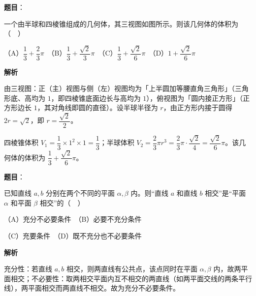 \begin{answer}

\textbf{题目}：

一个由半球和四棱锥组成的几何体，其三视图如图所示。则该几何体的体积为（　）
\nopagebreak[4]
\begin{center}\end{center}
\nopagebreak[4]
（A）\(\dfrac{1}{3}+\dfrac{2}{3}\pi\)　（B）\(\dfrac{1}{3}+\dfrac{\sqrt{2}}{3}\pi\)　（C）\(\dfrac{1}{3}+\dfrac{\sqrt{2}}{6}\pi\)　（D）\(1+\dfrac{\sqrt{2}}{6}\pi\)

\textbf{解析}

由三视图：正（主）视图与侧（左）视图均为「上半圆加等腰直角三角形」（三角形底、高均为 \(1\)，即四棱锥底面边长与高均为 \(1\)），俯视图为「圆内接正方形」（正方形边长 \(1\)，其对角线即圆的直径）。设半球半径为 \(r\)，由正方形内接于圆得 \(2r=\sqrt{2}\)，即 \(r=\dfrac{\sqrt{2}}{2}\)。

四棱锥体积 \(V_{1}=\dfrac{1}{3}\times 1^{2}\times 1=\dfrac{1}{3}\)；半球体积 \(V_{2}=\dfrac{2}{3}\pi r^{3}=\dfrac{2}{3}\pi\cdot\dfrac{\sqrt{2}}{4}=\dfrac{\sqrt{2}}{6}\pi\)。该几何体的体积为 \(\dfrac{1}{3}+\dfrac{\sqrt{2}}{6}\pi\)。


\end{answer}
\begin{answer}

\textbf{题目}：

已知直线 \(a,b\) 分别在两个不同的平面 \(\alpha,\beta\) 内。则“直线 \(a\) 和直线 \(b\) 相交”是“平面 \(\alpha\) 和平面 \(\beta\) 相交”的（　）

（A）充分不必要条件　（B）必要不充分条件

（C）充要条件　（D）既不充分也不必要条件

\textbf{解析}

充分性：若直线 \(a,b\) 相交，则两直线有公共点，该点同时在平面 \(\alpha,\beta\) 内，故两平面相交；不必要性：取两相交平面内互不相交的两直线（如两平面交线的两条平行线），两平面相交而两直线不相交。故为充分不必要条件。


\end{answer}
